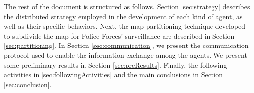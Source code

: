 The rest of the document is structured as follows. Section \ref{sec:strategy} describes the distributed strategy employed in the development of each kind of agent, as well as their specific behaviors. Next, the map partitioning technique developed to subdivide the map for Police Forces' surveillance are described in Section \ref{sec:partitioning}. In Section \ref{sec:communication}, we present the communication protocol used to enable the information exchange among the agents. We present some preliminary results in Section \ref{sec:preResults}. Finally, the following activities in \ref{sec:followingActivities} and the main conclusions in Section \ref{sec:conclusion}.
